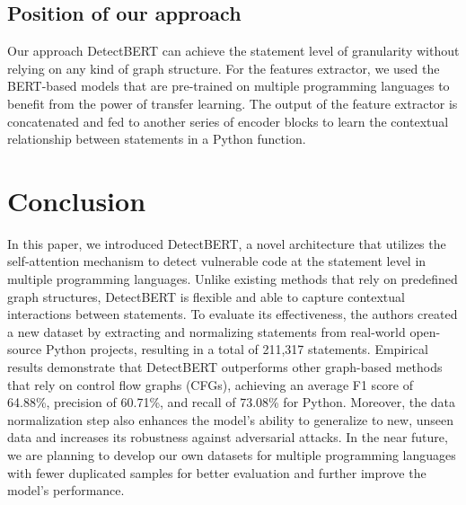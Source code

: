 \documentclass{ieeeaccess}
\begin{document}
\subsection{Position of our approach}
Our approach DetectBERT can achieve the statement level of granularity without relying on any kind of graph structure. For the features extractor, we used the BERT-based models \cite{mpnet,minilm,sbert} that are pre-trained on multiple programming languages to benefit from the power of transfer learning. The output of the feature extractor is concatenated and fed to another series of encoder blocks to learn the contextual relationship between statements in a Python function.


\section{Conclusion}

In this paper, we introduced DetectBERT, a novel architecture that utilizes the self-attention mechanism to detect vulnerable code at the statement level in multiple programming languages. Unlike existing methods that rely on predefined graph structures, DetectBERT is flexible and able to capture contextual interactions between statements. To evaluate its effectiveness, the authors created a new dataset by extracting and normalizing statements from real-world open-source Python projects, resulting in a total of 211,317 statements. Empirical results demonstrate that DetectBERT outperforms other graph-based methods that rely on control flow graphs (CFGs), achieving an average F1 score of 64.88\%, precision of 60.71\%, and recall of 73.08\% for Python. Moreover, the data normalization step also enhances the model's ability to generalize to new, unseen data and increases its robustness against adversarial attacks. In the near future, we are planning to develop our own datasets for multiple programming languages with fewer duplicated samples for better evaluation and further improve the model's performance.
 

\end{document}
